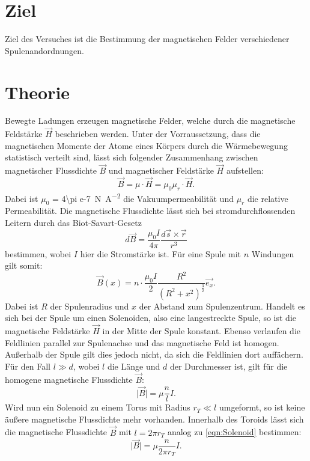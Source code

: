 \setcounter{page}{1}

\section{Ziel}
Ziel des Versuches ist die Bestimmung der magnetischen Felder verschiedener Spulenandordnungen.

\section{Theorie}

Bewegte Ladungen erzeugen magnetische Felder, welche durch die magnetische Feldstärke $\vec{H}$ beschrieben werden.
Unter der Vorraussetzung, dass die magnetischen Momente der Atome eines Körpers durch die Wärmebewegung
statistisch verteilt sind, lässt sich folgender Zusammenhang zwischen
magnetischer Flussdichte $\vec{B}$ und magnetischer Feldstärke $\vec{H}$ aufstellen:
\begin{equation}
  \vec{B}=\mu \cdot \vec{H}=\mu_0 \mu_r \cdot \vec{H} \label{eqn:mFdus} .
\end{equation}
Dabei ist $\mu_0$ = \SI{4\pi e-7}{\newton\per\ampere\squared} die Vakuumpermeabilität und $\mu_r$ die relative Permeabilität.
Die magnetische Flussdichte lässt sich bei stromdurchflossenden Leitern durch das Biot-Savart-Gesetz
\begin{equation}
  d\vec{B} = \frac{\mu_0 I}{4 \pi} \frac{d\vec{s} \times \vec{r}}{r^3} \label{eqn:bs}
\end{equation}
bestimmen, wobei $I$ hier die Stromstärke ist.
Für eine Spule mit $n$ Windungen gilt somit:
\begin{equation}
  \vec{B}(x) =n \cdot \frac{\mu_0 I}{2} \frac{R^2}{(R^2 + x^2)^{\frac{3}{2}}} \vec{e_x} \label{eqn:Spule}.
\end{equation}
Dabei ist $R$ der Spulenradius und $x$ der Abstand zum Spulenzentrum.
Handelt es sich bei der Spule um einen Solenoiden, also eine langestreckte Spule,
so ist die magnetische Feldstärke $\vec{H}$ in der Mitte der Spule konstant.
Ebenso verlaufen die Feldlinien parallel zur Spulenachse und das magnetische Feld ist homogen.
Außerhalb der Spule gilt dies jedoch nicht, da sich die Feldlinien dort auffächern.
Für den Fall $l \gg d$, wobei $l$ die Länge und $d$ der Durchmesser ist,
gilt für die homogene magnetische Flussdichte $\vec{B}$:
\begin{equation}
  \lvert \vec{B} \rvert= \mu \frac{n}{l}I \label{eqn:Solenoid}.
\end{equation}
Wird nun ein Solenoid zu einem Torus mit Radius $r_T \ll l$ umgeformt,
so ist keine äußere magnetische Flussdichte mehr vorhanden.
Innerhalb des Toroids lässt sich die magnetische Flussdichte $\vec{B}$ mit $l=2 \pi r_T$ analog zu \eqref{eqn:Solenoid}
bestimmen:
\begin{equation}
  \lvert \vec{B} \rvert= \mu \frac{n}{2 \pi r_T}I .
\end{equation}

